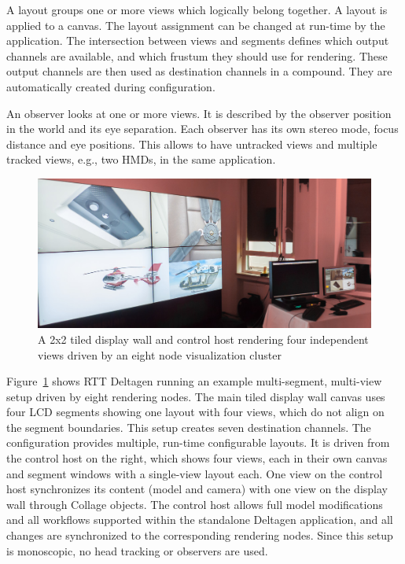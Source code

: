 \documentclass[10pt,journal,compsoc]{IEEEtran}
\newcommand{\fig}[1]{Figure~\ref{#1}}
\begin{document}
A layout groups one or more views which logically belong together. A layout is
applied to a canvas. The layout assignment can be changed at run-time by the
application. The intersection between views and segments defines which output
channels are available, and which frustum they should use for rendering. These
output channels are then used as destination channels in a compound. They are
automatically created during configuration.

\label{sec:observer}
An observer looks at one or more views. It is described by the observer position
in the world and its eye separation. Each observer has its own stereo
mode, focus distance and eye positions. This allows to have untracked
views and multiple tracked views, e.g., two HMDs, in the same application.

\begin{figure}[ht]\center
  \includegraphics[width=\columnwidth]{images/layout}
  \caption{\label{fLayout}A 2x2 tiled display wall and control host rendering four independent views driven by an eight node visualization cluster}
\end{figure}

\fig{fLayout} shows RTT Deltagen running an example multi-segment, multi-view
setup driven by eight rendering nodes. The main tiled display wall canvas uses
four LCD segments showing one layout with four views, which do not align on the
segment boundaries. This setup creates seven destination channels. The
configuration provides multiple, run-time configurable layouts. It is driven
from the control host on the right, which shows four views, each in their own
canvas and segment windows with a single-view layout each. One view on the
control host synchronizes its content (model and camera) with one view on the
display wall through Collage objects. The control host allows full model
modifications and all workflows supported within the standalone Deltagen
application, and all changes are synchronized to the corresponding rendering
nodes. Since this setup is monoscopic, no head tracking or observers are used.
\end{document}
